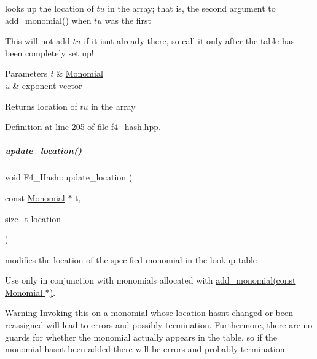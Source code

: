looks up the location of $tu$ in the array; that is, the second argument to {\ttfamily \hyperlink{group___g_b_computation_aaed2c308a7d79e098e6555d20b1720d0}{add\+\_\+monomial()}} when $tu$ was the first 

This will not add $tu$ if it isn\textquotesingle{}t already there, so call it only after the table has been completely set up! 
\begin{DoxyParams}{Parameters}
{\em t} & {\ttfamily \hyperlink{group__polygroup_class_monomial}{Monomial}} \\
\hline
{\em u} & {\ttfamily exponent} vector \\
\hline
\end{DoxyParams}
\begin{DoxyReturn}{Returns}
location of $tu$ in the array 
\end{DoxyReturn}


Definition at line 205 of file f4\+\_\+hash.\+hpp.

\mbox{\label{group___g_b_computation_a0f1a52f055247e86e6b65446c65a87b5}} 
\subparagraph{\texorpdfstring{update\+\_\+location()}{update\_location()}}
{\footnotesize\ttfamily void F4\+\_\+\+Hash\+::update\+\_\+location (\begin{DoxyParamCaption}\item[{const \hyperlink{group__polygroup_class_monomial}{Monomial} $\ast$}]{t,  }\item[{size\+\_\+t}]{location }\end{DoxyParamCaption})\hspace{0.3cm}{\ttfamily [inline]}}



modifies the location of the specified monomial in the lookup table 

Use only in conjunction with monomials allocated with {\ttfamily \hyperlink{group___g_b_computation_aaed2c308a7d79e098e6555d20b1720d0}{add\+\_\+monomial(const Monomial $\ast$)}}. \begin{DoxyWarning}{Warning}
Invoking this on a monomial whose location hasn\textquotesingle{}t changed or been reassigned will lead to errors and possibly termination. Furthermore, there are no guards for whether the monomial actually appears in the table, so if the monomial hasn\textquotesingle{}t been added there will be errors and probably termination. 
\end{DoxyWarning}

